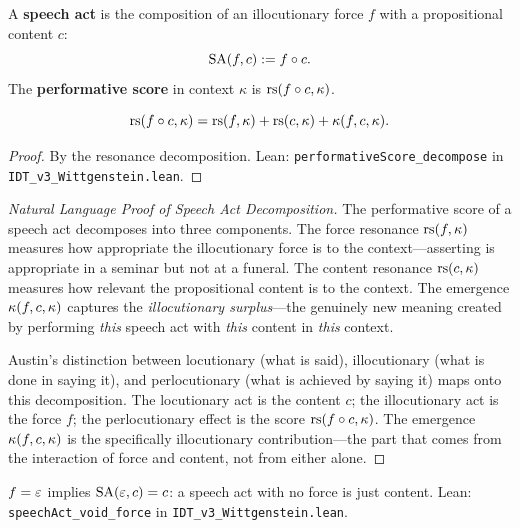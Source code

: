 \begin{definition}
\label{def:speech-act}
A \textbf{speech act} is the composition of an illocutionary force $f$ with
a propositional content $c$:
\[
\mathrm{SA}(f, c) := f \circ c.
\]
The \textbf{performative score} in context $\kappa$ is $\mathrm{rs}(f \circ c, \kappa)$.
\end{definition}

\begin{theorem}
\label{thm:speech-act-decompose}
\[
\mathrm{rs}(f \circ c, \kappa) = \mathrm{rs}(f, \kappa) + \mathrm{rs}(c, \kappa)
+ \kappa(f, c, \kappa).
\]
\end{theorem}

\begin{proof}
By the resonance decomposition.
Lean: \texttt{performativeScore\_decompose} in
\texttt{IDT\_v3\_Wittgenstein.lean}.
\end{proof}

\begin{proof}[Natural Language Proof of Speech Act Decomposition]
The performative score of a speech act decomposes into three components.
The force resonance $\mathrm{rs}(f, \kappa)$ measures how appropriate the illocutionary
force is to the context---asserting is appropriate in a seminar but not at a
funeral. The content resonance $\mathrm{rs}(c, \kappa)$ measures how relevant the
propositional content is to the context. The emergence $\kappa(f, c, \kappa)$
captures the \emph{illocutionary surplus}---the genuinely new meaning created
by performing \emph{this} speech act with \emph{this} content in \emph{this}
context.

Austin's distinction between locutionary (what is said), illocutionary (what
is done in saying it), and perlocutionary (what is achieved by saying it) maps
onto this decomposition. The locutionary act is the content $c$; the illocutionary
act is the force $f$; the perlocutionary effect is the score $\mathrm{rs}(f \circ c,
\kappa)$. The emergence $\kappa(f, c, \kappa)$ is the specifically illocutionary
contribution---the part that comes from the interaction of force and content,
not from either alone.
\end{proof}

\begin{theorem}
\label{thm:void-force}
$f = \varepsilon$ implies $\mathrm{SA}(\varepsilon, c) = c$: a speech act with no force
is just content.
Lean: \texttt{speechAct\_void\_force} in \texttt{IDT\_v3\_Wittgenstein.lean}.
\end{theorem}


